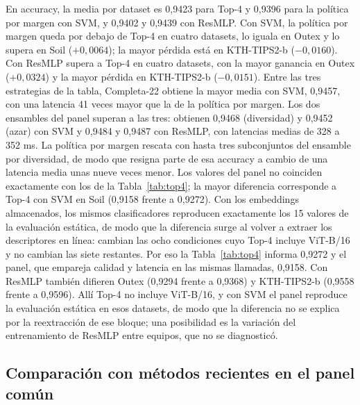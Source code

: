 \documentclass[a4paper,fleqn]{cas-sc}
\begin{document}
En accuracy, la media por dataset es 0,9423 para Top-4 y 0,9396 para la política por margen con SVM, y 0,9402 y 0,9439 con ResMLP. Con SVM, la política por margen queda por debajo de Top-4 en cuatro datasets, lo iguala en Outex y lo supera en Soil ($+0{,}0064$); la mayor pérdida está en KTH-TIPS2-b ($-0{,}0160$). Con ResMLP supera a Top-4 en cuatro datasets, con la mayor ganancia en Outex ($+0{,}0324$) y la mayor pérdida en KTH-TIPS2-b ($-0{,}0151$). Entre las tres estrategias de la tabla, Completa-22 obtiene la mayor media con SVM, 0,9457, con una latencia 41 veces mayor que la de la política por margen. Los dos ensambles del panel superan a las tres: obtienen 0,9468 (diversidad) y 0,9452 (azar) con SVM y 0,9484 y 0,9487 con ResMLP, con latencias medias de 328 a 352 ms. La política por margen rescata con hasta tres subconjuntos del ensamble por diversidad, de modo que resigna parte de esa accuracy a cambio de una latencia media unas nueve veces menor. Los valores del panel no coinciden exactamente con los de la Tabla~\ref{tab:top4}; la mayor diferencia corresponde a Top-4 con SVM en Soil (0,9158 frente a 0,9272). Con los embeddings almacenados, los mismos clasificadores reproducen exactamente los 15 valores de la evaluación estática, de modo que la diferencia surge al volver a extraer los descriptores en línea: cambian las ocho condiciones cuyo Top-4 incluye ViT-B/16 y no cambian las siete restantes. Por eso la Tabla~\ref{tab:top4} informa 0,9272 y el panel, que empareja calidad y latencia en las mismas llamadas, 0,9158. Con ResMLP también difieren Outex (0,9294 frente a 0,9368) y KTH-TIPS2-b (0,9558 frente a 0,9596). Allí Top-4 no incluye ViT-B/16, y con SVM el panel reproduce la evaluación estática en esos datasets, de modo que la diferencia no se explica por la reextracción de ese bloque; una posibilidad es la variación del entrenamiento de ResMLP entre equipos, que no se diagnosticó.

\subsection{Comparación con métodos recientes en el panel común}\label{sec:sota}
\end{document}
